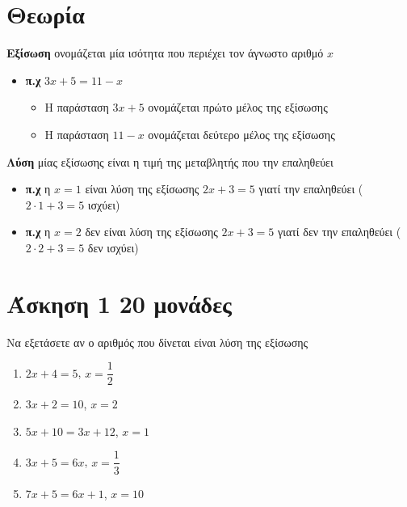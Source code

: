\documentclass[a4paper,10pt]{report}
\begin{document}
\section*{Θεωρία \hfill \small{}}
\textbf{Εξίσωση} ονομάζεται μία ισότητα που περιέχει τον άγνωστο αριθμό $x$\\
\begin{itemize}
 \item \textbf{π.χ} $3x+5=11-x$ \\
       \begin{itemize}
        \item Η παράσταση $3x+5$ ονομάζεται πρώτο μέλος της εξίσωσης
        \item Η παράσταση $11-x$ ονομάζεται δεύτερο μέλος της εξίσωσης
       \end{itemize}
\end{itemize}
\textbf{Λύση} μίας εξίσωσης είναι η τιμή της μεταβλητής που την επαληθεύει
\begin{itemize}
 \item \textbf{π.χ} η $x=1$ είναι λύση της εξίσωσης $2x+3=5$ γιατί την επαληθεύει ($2\cdot1+3=5$ ισχύει) 
 \item \textbf{π.χ} η $x=2$ δεν είναι λύση της εξίσωσης $2x+3=5$ γιατί δεν την επαληθεύει ($2\cdot2+3=5$ δεν ισχύει) 
\end{itemize}




\section*{Άσκηση 1  \hfill \small{20 μονάδες}}
Να εξετάσετε αν ο αριθμός που δίνεται είναι λύση της εξίσωσης
\begin{enumerate}[1)]
 \item $2x+4=5$, \quad $x=\dfrac{1}{2}$
 \item $3x+2=10$, \quad $x=2$
 \item $5x+10=3x+12$, \quad $x=1$
 \item $3x+5=6x$, \quad $x=\dfrac{1}{3}$
 \item $7x+5=6x+1$, \quad $x=10$
\end{enumerate}
\end{document}
